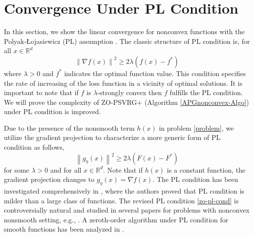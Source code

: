 \documentclass{article}
\newcommand*{\R}{\mathbb{R}}
\newcommand{\norm}[1]{\left\lVert#1\right\rVert}
\theoremstyle{definition}
\theoremstyle{remark}
\begin{document}
\section{Convergence Under PL Condition}
In this section, we show the linear convergence for nonconvex functions with the Polyak-Łojasiewicz (PL) assumption \cite{polyak1963gradient}.
The classic structure of PL condition is, for all $x\in\R^d$
\begin{equation}
\norm{\nabla f(x)}^2 \geq 2\lambda (f(x) - f^*)
\end{equation}
where $\lambda >0$ and $f^*$ indicates the optimal function value. This condition specifies the rate of increasing of the loss function in a vicinity of optimal solutions. It is important to note that if $f$ is $\lambda$-strongly convex then $f$ fulfills the PL condition. We will prove the complexity of ZO-PSVRG+ (Algorithm \ref{APGnonconvex-Algo}) under PL condition is improved.

Due to the presence of the nonsmooth term $h(x)$ in problem \eqref{problem}, we utilize the gradient projection to characterize a more generic form of PL condition as follows, 
\begin{equation}\label{zo-pl-cond}
\norm{g_{\eta}(x)}^2 \geq 2\lambda (F(x) - F^*)
\end{equation}
for some $\lambda >0$ and for all $x\in\R^d$. Note that if $h(x)$ is a constant function, the gradient projection changes to $g_{\eta}(x) = \nabla f(x)$.
The PL condition has been investigated comprehensively in \cite{karimi2016linear}, where the authors proved that PL condition is milder than a large class of  functions.  
The revised PL condition \eqref{zo-pl-cond} is controversially natural and studied in several papers for problems with nonconvex nonsmooth setting, e.g., \cite{li2018simple}. A zeroth-order algorithm under PL condition for smooth functions has been analyzed in \cite{ji2019improved}.
\end{document}
